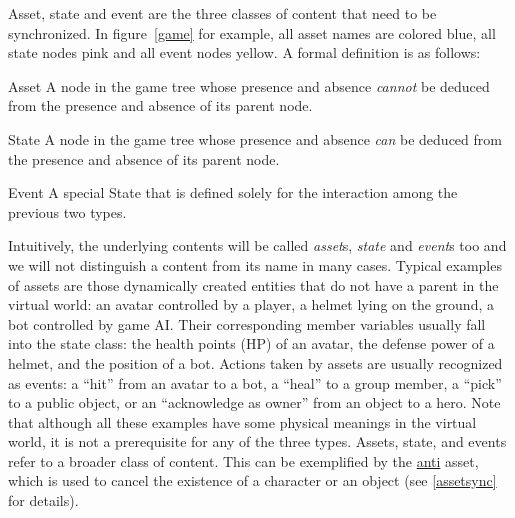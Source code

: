 Asset, state and event are the three classes of content that need to be synchronized. In figure~\ref{game} for example, all asset names are colored blue, all state nodes pink and all event nodes yellow. A formal definition is as follows:
\begin{description*} 
\item [Asset]
A node in the game tree whose presence and absence \emph{cannot} be deduced from the presence and absence of its parent node.
\item [State]
A node in the game tree whose presence and absence \emph{can} be deduced from the presence and absence of its parent node.
\item [Event]
A special State that is defined solely for the interaction among the previous two types.
\end{description*}
Intuitively, the underlying contents will be called \emph{asset}s, \emph{state} and \emph{event}s too and we will not distinguish a content from its name in many cases. Typical examples of assets are those dynamically created entities that do not have a parent in the virtual world: an avatar controlled by a player, a helmet lying on the ground, a bot controlled by game AI. Their corresponding member variables usually fall into the state class: the health points (HP) of an avatar, the defense power of a helmet, and the position of a bot. Actions taken by assets are usually recognized as events: a ``hit'' from an avatar to a bot, a ``heal'' to a group member, a ``pick'' to a public object, or an ``acknowledge as owner'' from an object to a hero. Note that although all these examples have some physical meanings in the virtual world, it is not a prerequisite for any of the three types. Assets, state, and events refer to a broader class of content. This can be exemplified by the \url{anti} asset, which is used to cancel the existence of a character or an object (see \ref{assetsync} for details).

